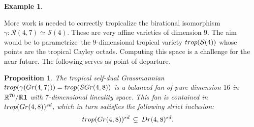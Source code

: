 \documentclass[12pt]{extarticle}
\newtheorem{proposition}[theorem]{Proposition}
\theoremstyle{definition}
\newtheorem{example}[theorem]{Example}
\numberwithin{theorem}{section}
\theoremstyle{plain}\newtheorem{ithm}{Theorem}
\newcommand{\RR}{\mathbb{R}}
\begin{document}
\begin{example}
\end{example}
  
More work is needed to correctly tropicalize the  birational isomorphism
$ \gamma: \mathcal{R}(4,7) \simeq \mathcal{S}(4)$. These
are very affine varieties of dimension $9$.
The aim would be to parametrize~the $9$-dimensional tropical variety
${\rm trop}(\mathcal{S}(4))$ whose points are the
tropical Cayley octads. Computing this space
is a challenge for the near future.
The following serves as point of departure.



  \begin{proposition}
  The tropical self-dual Grassmannian ${\rm trop}(\gamma({\rm Gr}(4,7))) = {\rm trop}({\rm SGr}(4,8))$
    is a balanced fan of pure dimension $16$ in $\RR^{70}/\RR {\bf 1}$ with $7$-dimensional
    lineality space. 
    This fan is contained in ${\rm trop}({\rm Gr}(4,8))^{\rm sd}$,
    which in turn satisfies the
     following strict inclusion:
    \begin{equation}
      \label{eq:threestrict}
      {\rm trop}({\rm Gr}(4,8))^{\rm sd} \, \subsetneq \,
      {\rm Dr}(4,8)^{\rm sd}.
\end{equation}      
    \end{proposition}
    
\end{document}
